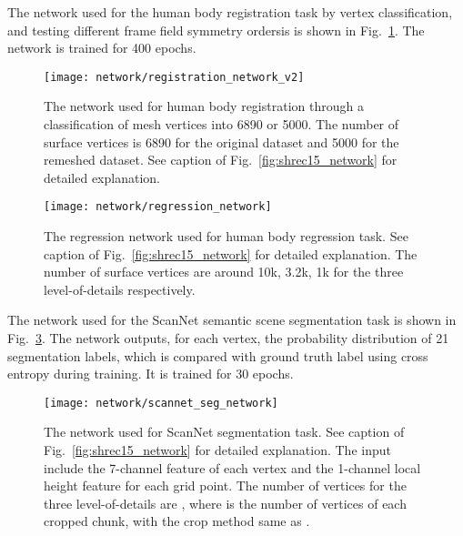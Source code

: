 \documentclass[10pt,twocolumn,letterpaper]{article}
\begin{document}
The network used for the human body registration task by vertex classification, 
and testing different frame field symmetry ordersis is shown in Fig.~\ref{fig:faust_classification_network}.
The network is trained for 400 epochs.

\begin{figure}[t]
	\center
	\texttt{[image: network/registration\_network\_v2]}
	\vspace{0mm}
	\caption{The network used for human body registration through a classification of mesh vertices into 6890 or 5000. The number of surface vertices is 6890 for the original dataset and 5000 for the remeshed dataset. See caption of Fig.~\ref{fig:shrec15_network} for detailed explanation.
	}
	\label{fig:faust_classification_network}
	\vspace{-3mm}
\end{figure}

\begin{figure}
	\texttt{[image: network/regression\_network]}
	\vspace{-3mm}
	\caption{The regression network used for human body regression task. See caption of Fig.~\ref{fig:shrec15_network} for detailed explanation. The number of surface vertices are around 10k, 3.2k, 1k for the three level-of-details respectively.}
	\label{fig:faust_regression_network}
	\vspace{0mm}
\end{figure}

The network used for the ScanNet semantic scene segmentation task is shown in Fig.~\ref{fig:scannet_seg_network}.
The network outputs, for each vertex, the probability distribution of 21 segmentation labels, which is compared with ground truth label using cross entropy during training. It is trained for 30 epochs.

\begin{figure}[t]
	\texttt{[image: network/scannet\_seg\_network]}
	\vspace{-2mm}
	\caption{The network used for ScanNet segmentation task. See caption of Fig.~\ref{fig:shrec15_network} for detailed explanation. The input include the 7-channel feature of each vertex and the 1-channel local height feature for each grid point. The number of vertices for the three level-of-details are , where  is the number of vertices of each cropped chunk, with the crop method same as \cite{Huang_2019_CVPR}. }
	\label{fig:scannet_seg_network}
	\vspace{-2mm}
\end{figure}
\end{document}
